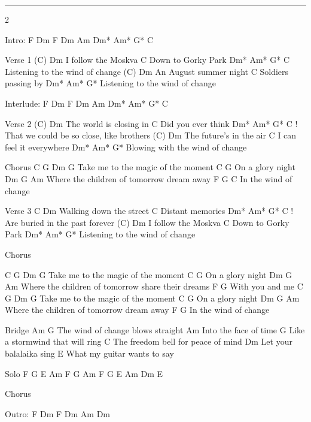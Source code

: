 \noindent\rule{\columnwidth}{1pt}

\begin{multicols}{2}
\begin{lstsong}
Intro: F Dm F Dm Am Dm* Am* G* C

Verse 1
(C)              Dm
 I follow the Moskva
               C
 Down to Gorky Park
                  Dm*      Am*  G*  C
 Listening to the wind of change
(C)               Dm
 An August summer night
                  C
 Soldiers passing by
                  Dm*      Am*  G*
 Listening to the wind of change

Interlude: F Dm F Dm Am Dm* Am* G* C

Verse 2
(C)                   Dm
 The world is closing in
              C
 Did you ever think
                     Dm*          Am*    G*  C !
 That we could be so close, like brothers
(C)                  Dm
 The future's in the air
                    C
 I can feel it everywhere
                  Dm*      Am*  G*
 Blowing with the wind of change
 
Chorus 
C     G         Dm           G
 Take me to the magic of the moment
      C     G
On a glory night
          Dm            G             Am
Where the children of tomorrow dream away
 F               G         C
In the wind of change

Verse 3
C                 Dm
 Walking down the street
             C
 Distant memories
                   Dm*     Am*  G*  C !
 Are buried in the past forever
(C)              Dm
 I follow the Moskva
               C
 Down to Gorky Park
                  Dm*      Am*  G*
 Listening to the wind of change

Chorus
 
C     G         Dm           G
Take me to the magic of the moment
      C     G
On a glory night
          Dm            G                  Am
Where the children of tomorrow share their dreams
      F      G
With you and me
C     G         Dm           G
Take me to the magic of the moment
      C     G
On a glory night
          Dm            G             Am
Where the children of tomorrow dream away
       F       G
In the wind of change
 
Bridge 
Am                        G
 The wind of change blows straight
                  Am
Into the face of time
                           G
Like a stormwind that will ring
                              C
The freedom bell for peace of mind
                   Dm
Let your balalaika sing
                        E
What my guitar wants to say

Solo
F  G  E  Am  F  G  Am
F  G  E  Am  Dm  E

Chorus

Outro: F  Dm  F  Dm  Am  Dm
\end{lstsong}
\end{multicols}
\newpage

